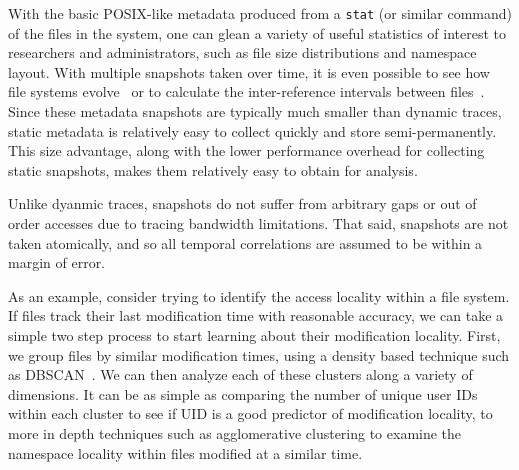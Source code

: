 With the basic POSIX-like metadata produced from a \texttt{stat} (or similar
command) of the files in the system, one can glean
a variety of useful statistics of interest to researchers and administrators,
such as file size distributions and namespace layout. With multiple snapshots taken
over time, it is even possible to see how file systems
evolve~\cite{agrawal:fast07} or to calculate the inter-reference
intervals between files~\cite{gibson:cmg98}.
 Since these metadata snapshots are
typically much smaller than dynamic traces, static metadata is relatively easy
to collect quickly and store semi-permanently. This size advantage, along with
the lower performance overhead for collecting static snapshots, makes them
relatively easy to obtain for analysis.

Unlike dyanmic traces, snapshots do not
suffer from arbitrary gaps or out of order accesses due to tracing bandwidth
limitations.  That said, snapshots are not taken atomically, and so all temporal
correlations are assumed to be within a margin of error. 

As an example, consider trying to identify the access locality within a file
system. %
If files track their last modification time with
reasonable accuracy, we can take a simple two step process to start learning
about their modification locality. First, we group files by similar modification
times, using a density based technique such as DBSCAN~\cite{ester:kdd1996}. We
can then analyze each of these clusters along a variety of dimensions. It can be
as simple as comparing the number of unique user IDs within each cluster to see
if UID is a good predictor of modification locality, to more in depth techniques
such as agglomerative clustering to examine the namespace locality within files
modified at a similar time.
